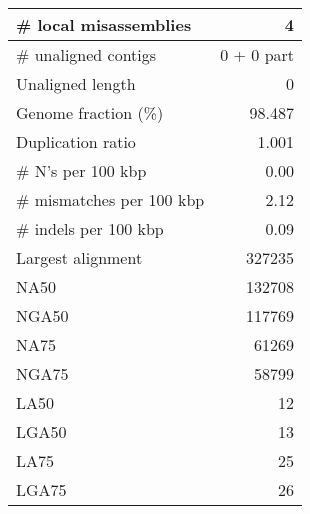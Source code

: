\documentclass[12pt,a4paper]{article}
\begin{document}
\begin{table}[ht]
\begin{center}
\begin{tabular}{|l*{1}{|r}|}
\# local misassemblies & 4 \\ \hline
\# unaligned contigs & 0 + 0 part \\ \hline
Unaligned length & 0 \\ \hline
Genome fraction (\%) & 98.487 \\ \hline
Duplication ratio & 1.001 \\ \hline
\# N's per 100 kbp & 0.00 \\ \hline
\# mismatches per 100 kbp & 2.12 \\ \hline
\# indels per 100 kbp & 0.09 \\ \hline
Largest alignment & 327235 \\ \hline
NA50 & 132708 \\ \hline
NGA50 & 117769 \\ \hline
NA75 & 61269 \\ \hline
NGA75 & 58799 \\ \hline
LA50 & 12 \\ \hline
LGA50 & 13 \\ \hline
LA75 & 25 \\ \hline
LGA75 & 26 \\ \hline
\end{tabular}
\end{center}
\end{table}
\end{document}
